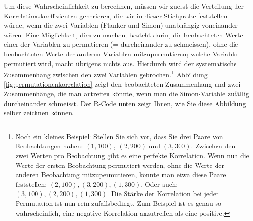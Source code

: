 \documentclass[oneside, 10pt]{book}\usepackage[]{graphicx}\usepackage[]{xcolor}
\begin{document}
Um diese Wahrscheinlichkeit zu berechnen,
müssen wir zuerst die Verteilung der
Korrelationskoeffizienten generieren, die
wir in dieser Stichprobe feststellen würde,
wenn die zwei Variablen (Flanker und Simon)
unabhängig voneinander wären. Eine Möglichkeit,
dies zu machen, besteht darin, die beobachteten
Werte einer der Variablen zu permutieren
(= durcheinander zu schmeissen), ohne die
beobachteten Werte der anderen Variablen mitzupermutieren;
welche Variable permutiert wird, macht übrigens nichts aus.
Hierdurch wird der systematische Zusammenhang
zwischen den zwei Variablen gebrochen.\footnote{Noch ein kleines Beispiel: Stellen Sie sich vor, dass Sie drei Paare von Beobachtungen haben: $(1, 100)$, $(2, 200)$ und $(3, 300)$. Zwischen den zwei Werten pro Beobachtung gibt es eine perfekte Korrelation. Wenn nun die Werte der ersten Beobachtung permutiert werden, ohne die Werte der anderen Beobachtung mitzupermutieren, könnte man etwa diese Paare feststellen: $(2, 100), (3, 200), (1, 300)$. Oder auch: $(3, 100), (2, 200), (1, 300)$. Die Stärke der Korrelation bei jeder Permutation ist nun rein zufallsbedingt. Zum Beispiel ist es genau so wahrscheinlich, eine negative Korrelation anzutreffen als eine positive.}
Abbildung \ref{fig:permutationenkorrelation} zeigt den beobachteten Zusammenhang
und zwei Zusammenhänge, die man antreffen könnte, wenn man
die Simon-Variable zufällig durcheinander schmeisst.
Der R-Code unten zeigt Ihnen, wie Sie diese Abbildung selber zeichnen können.
\end{document}
